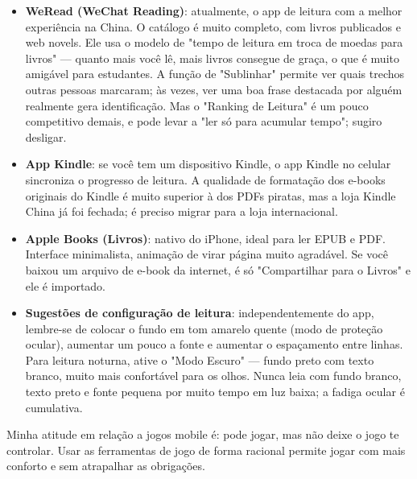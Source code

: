 \begin{itemize}
  \item \textbf{WeRead (WeChat Reading)}: atualmente, o app de leitura com a melhor experiência na China. O catálogo é muito completo, com livros publicados e web novels. Ele usa o modelo de "tempo de leitura em troca de moedas para livros" — quanto mais você lê, mais livros consegue de graça, o que é muito amigável para estudantes. A função de "Sublinhar" permite ver quais trechos outras pessoas marcaram; às vezes, ver uma boa frase destacada por alguém realmente gera identificação. Mas o "Ranking de Leitura" é um pouco competitivo demais, e pode levar a "ler só para acumular tempo"; sugiro desligar.
  \item \textbf{App Kindle}: se você tem um dispositivo Kindle, o app Kindle no celular sincroniza o progresso de leitura. A qualidade de formatação dos e-books originais do Kindle é muito superior à dos PDFs piratas, mas a loja Kindle China já foi fechada; é preciso migrar para a loja internacional.
  \item \textbf{Apple Books (Livros)}: nativo do iPhone, ideal para ler EPUB e PDF. Interface minimalista, animação de virar página muito agradável. Se você baixou um arquivo de e-book da internet, é só "Compartilhar para o Livros" e ele é importado.
  \item \textbf{Sugestões de configuração de leitura}: independentemente do app, lembre-se de colocar o fundo em tom amarelo quente (modo de proteção ocular), aumentar um pouco a fonte e aumentar o espaçamento entre linhas. Para leitura noturna, ative o "Modo Escuro" — fundo preto com texto branco, muito mais confortável para os olhos. Nunca leia com fundo branco, texto preto e fonte pequena por muito tempo em luz baixa; a fadiga ocular é cumulativa.
\end{itemize}


Minha atitude em relação a jogos mobile é: pode jogar, mas não deixe o jogo te controlar. Usar as ferramentas de jogo de forma racional permite jogar com mais conforto e sem atrapalhar as obrigações.

